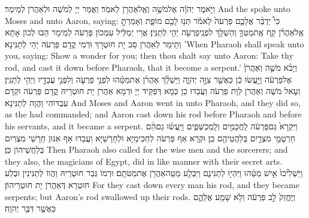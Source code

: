 {וַיֹּ֣אמֶר יְהֹוָ֔ה אֶל\maqqaf מֹשֶׁ֥ה וְאֶֽל\maqqaf אַהֲרֹ֖ן לֵאמֹֽר׃}
{וַאֲמַר יְיָ לְמֹשֶׁה וּלְאַהֲרֹן לְמֵימַר׃}
{And the \lord\space spoke unto Moses and unto Aaron, saying:}{}
{כִּי֩ יְדַבֵּ֨ר אֲלֵכֶ֤ם פַּרְעֹה֙ לֵאמֹ֔ר תְּנ֥וּ לָכֶ֖ם מוֹפֵ֑ת וְאָמַרְתָּ֣ אֶֽל\maqqaf אַהֲרֹ֗ן קַ֧ח אֶֽת\maqqaf מַטְּךָ֛ וְהַשְׁלֵ֥ךְ לִפְנֵֽי\maqqaf פַרְעֹ֖ה יְהִ֥י לְתַנִּֽין׃}
{אֲרֵי יְמַלֵּיל עִמְּכוֹן פַּרְעֹה לְמֵימַר הַבוּ לְכוֹן אָתָא וְתֵימַר לְאַהֲרֹן סַב יָת חוּטְרָךְ וּרְמִי קֳדָם פַּרְעֹה יְהֵי לְתַנִּינָא׃}
{’When Pharaoh shall speak unto you, saying: Show a wonder for you; then thou shalt say unto Aaron: Take thy rod, and cast it down before Pharaoh, that it become a serpent.’}{}
{וַיָּבֹ֨א מֹשֶׁ֤ה וְאַהֲרֹן֙ אֶל\maqqaf פַּרְעֹ֔ה וַיַּ֣עֲשׂוּ כֵ֔ן כַּאֲשֶׁ֖ר צִוָּ֣ה יְהֹוָ֑ה וַיַּשְׁלֵ֨ךְ אַהֲרֹ֜ן אֶת\maqqaf מַטֵּ֗הוּ לִפְנֵ֥י פַרְעֹ֛ה וְלִפְנֵ֥י עֲבָדָ֖יו וַיְהִ֥י לְתַנִּֽין׃}
{וְעָאל מֹשֶׁה וְאַהֲרֹן לְוָת פַּרְעֹה וַעֲבַדוּ כֵן כְּמָא דְּפַקֵּיד יְיָ וּרְמָא אַהֲרֹן יָת חוּטְרֵיהּ קֳדָם פַּרְעֹה וּקְדָם עַבְדּוֹהִי וַהֲוָה לְתַנִּינָא׃}
{And Moses and Aaron went in unto Pharaoh, and they did so, as the \lord\space had commanded; and Aaron cast down his rod before Pharaoh and before his servants, and it became a serpent.}{}
{וַיִּקְרָא֙ גַּם\maqqaf פַּרְעֹ֔ה לַֽחֲכָמִ֖ים וְלַֽמְכַשְּׁפִ֑ים וַיַּֽעֲשׂ֨וּ גַם\maqqaf הֵ֜ם חַרְטֻמֵּ֥י מִצְרַ֛יִם בְּלַהֲטֵיהֶ֖ם כֵּֽן׃}
{וּקְרָא אַף פַּרְעֹה לְחַכִּימַיָּא וּלְחָרָשַׁיָּא וַעֲבַדוּ אַף אִנּוּן חָרָשֵׁי מִצְרַיִם בְּלַחֲשֵׁיהוֹן כֵּן׃}
{Then Pharaoh also called for the wise men and the sorcerers; and they also, the magicians of Egypt, did in like manner with their secret arts.}{}
{וַיַּשְׁלִ֙יכוּ֙ אִ֣ישׁ מַטֵּ֔הוּ וַיִּהְי֖וּ לְתַנִּינִ֑ם וַיִּבְלַ֥ע מַטֵּֽה\maqqaf אַהֲרֹ֖ן אֶת\maqqaf מַטֹּתָֽם׃}
{וּרְמוֹ גְּבַר חוּטְרֵיהּ וַהֲווֹ לְתַנִּינִין וּבְלַע חוּטְרָא דְּאַהֲרֹן יָת חוּטְרֵיהוֹן׃}
{For they cast down every man his rod, and they became serpents; but Aaron’s rod swallowed up their rods.}{}
{וַיֶּחֱזַק֙ לֵ֣ב פַּרְעֹ֔ה וְלֹ֥א שָׁמַ֖ע אֲלֵהֶ֑ם כַּאֲשֶׁ֖ר דִּבֶּ֥ר יְהֹוָֽה׃ \setuma }
